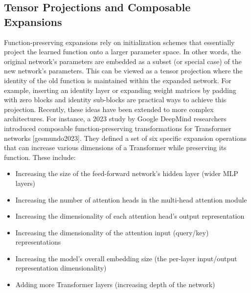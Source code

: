 \subsection{Tensor Projections and Composable Expansions}
Function-preserving expansions rely on initialization schemes that essentially project the learned function onto a larger parameter space. In other words, the original network’s parameters are embedded as a subset (or special case) of the new network’s parameters. This can be viewed as a tensor projection where the identity of the old function is maintained within the expanded network. For example, inserting an identity layer or expanding weight matrices by padding with zero blocks and identity sub-blocks are practical ways to achieve this projection. Recently, these ideas have been extended to more complex architectures. For instance, a 2023 study by Google DeepMind researchers introduced composable function-preserving transformations for Transformer networks [gesmundo2023]. They defined a set of six specific expansion operations that can increase various dimensions of a Transformer while preserving its function. These include:

\begin{itemize}
\item Increasing the size of the feed-forward network’s hidden layer (wider MLP layers)
\item Increasing the number of attention heads in the multi-head attention module
\item Increasing the dimensionality of each attention head’s output representation
\item Increasing the dimensionality of the attention input (query/key) representations
\item Increasing the model’s overall embedding size (the per-layer input/output representation dimensionality)
\item Adding more Transformer layers (increasing depth of the network)
\end{itemize}

